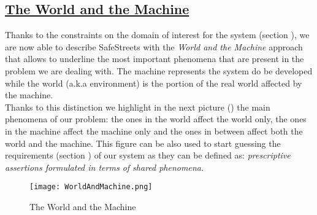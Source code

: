 \subsection[The World and the Machine]{\hyperlink{toc}{The World and the Machine}}
	\label{sec:worldMachine}
	Thanks to the constraints on the domain of interest for the system (section ), we are now able to describe SafeStreets with the \textit{World and the Machine} approach that allows to underline the most important phenomena that are present in the problem we are dealing with. The machine represents the system do be developed while the world (a.k.a environment) is the portion of the real world affected by the machine.\\
	
	Thanks to this distinction we highlight in the next picture () the main phenomena of our problem: the ones in the world affect the world only, the ones in the machine affect the machine only and the ones in between affect both the world and the machine. This figure can be also used to start guessing the requirements (section ) of our system as they can be defined as: \textit{prescriptive assertions formulated in terms of shared phenomena.}
	\vspace{1cm} 
	
	\begin{figure}[h]
		\centering
		\texttt{[image: WorldAndMachine.png]}
		\caption{\label{fig:worldAndMachine}The World and the Machine}
	\end{figure}
 	 